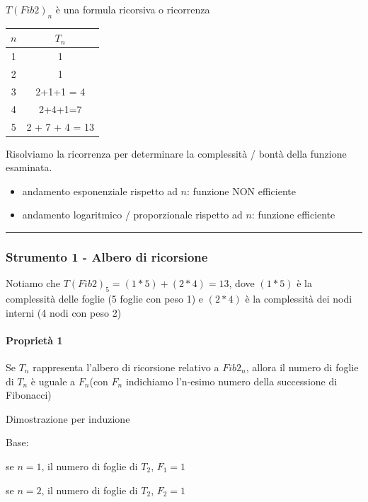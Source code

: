\documentclass[11pt,a4paper,twoside,openright]{book}
\providecommand{\tightlist}{\setlength{\itemsep}{0pt}\setlength{\parskip}{0pt}}
\let\oldparagraph\paragraph
\renewcommand{\paragraph}[1]{\oldparagraph{#1}\mbox{}}
\begin{document}
{{{{$T(Fib2)_n$ è una formula ricorsiva o ricorrenza}


\begin{tabular}{|c|c|}
\hline 
$n$ & $T_n$ \\ 
\hline 
1 & 1 \\ 
\hline 
2 & 1 \\ 
\hline 
3 & 2+1+1 = 4 \\ 
\hline 
4 & 2+4+1=7 \\ 
\hline 
5 & 2 + 7 + 4 = 13 \\ 
\hline 
\end{tabular} 

{Risolviamo la ricorrenza per determinare la complessità / bontà della funzione esaminata.}

\begin{itemize}
\tightlist
\item
  {andamento esponenziale rispetto ad $n$: funzione NON efficiente}
\item
  {andamento logaritmico / proporzionale rispetto ad $n$: funzione
  efficiente}
\end{itemize}

\begin{center}\rule{0.5\linewidth}{\linethickness}\end{center}

\subsubsection{Strumento 1 - Albero di ricorsione}

{Notiamo che $T(Fib2)_5=(1*5)+(2*4)=13$, dove $(1 * 5)$ è la complessità delle foglie (5 foglie con peso 1) e $(2 * 4)$ è la complessità dei nodi interni (4 nodi con peso 2)}



\paragraph{Proprietà 1}

{Se $T_n$ rappresenta l'albero di ricorsione relativo a $Fib2_n$, allora il numero di foglie di $T_n$ è uguale a $F_n$(con $F_n$ indichiamo l'n-esimo numero della successione di Fibonacci)}

{Dimostrazione per induzione}

{Base:}

{se $n = 1$, il numero di foglie di $T_2$, $F_1=1$}

{se $n = 2$, il numero di foglie di $T_2$, $F_2=1$}

}}}
\end{document}
